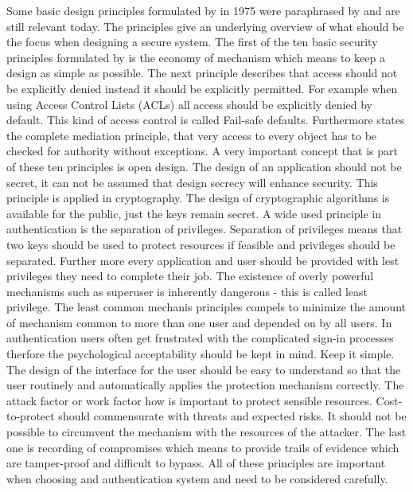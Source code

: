 Some basic design principles formulated by \cite{Saltzer:PICS} in 1975 were paraphrased by \cite{Neumann:2018:PTC} and are still relevant today. The principles give an underlying overview of what should be the focus when designing a secure system. The first of the ten basic security principles formulated by \cite{Saltzer:PICS} is the economy of mechanism which means to keep a design as simple as possible.
The next principle describes that access should not be explicitly denied instead it should be explicitly permitted. For example when using Access Control Lists (ACLs) all access should be explicitly denied by default. This kind of access control is called Fail-safe defaults. Furthermore \cite{Saltzer:PICS} states the complete mediation principle, that very access to every object has to be checked for authority without exceptions. A very important concept that is part of these ten principles is open design. The design of an application should not be secret, it can not be assumed that design secrecy will enhance security. This principle is applied in cryptography. The design of cryptographic algorithms is available for the public, just the keys remain secret. A wide used principle in authentication is the separation of privileges. Separation of privileges means that two keys should be used to protect resources if feasible and privileges should be separated.  Further more every application and user should be provided with lest privileges they need to complete their job. The existence of overly powerful mechanisms such as superuser is inherently dangerous - this is called least privilege. The least common mechanis principles compels to minimize the amount of mechanism common to more than one user and depended on by all users. In authentication users often get frustrated with the complicated sign-in processes therfore the psychological acceptability should be kept in mind. Keep it simple. The design of the interface for the user should be easy to understand so that the user routinely and automatically applies the protection mechanism correctly. The attack factor or work factor how \cite{Saltzer:PICS} is important to protect sensible resources. Cost-to-protect should commensurate with threats and expected risks. It should not be possible to circumvent the mechanism with the resources of the attacker.   
The last one is recording of compromises which means to provide trails of evidence which are tamper-proof and difficult to bypass. All of these principles are important when choosing and authentication system and need to be considered carefully. 
	
